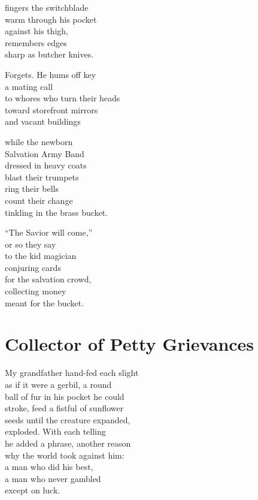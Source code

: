 \documentclass[twoside,10pt]{book}
\begin{document}
fingers the switchblade\\
warm through his pocket\\
against his thigh,\\
remembers edges\\
sharp as butcher knives.

Forgets. He hums off key\\
a mating call\\
to whores who turn their heads\\
toward storefront mirrors\\
and vacant buildings

while the newborn\\
Salvation Army Band\\
dressed in heavy coats\\
blast their trumpets\\
ring their bells\\
count their change\\
tinkling in the brass bucket.

``The Savior will come,''\\
or so they say\\
to the kid magician\\
conjuring cards\\
for the salvation crowd,\\
collecting money\\
meant for the bucket.


\clearpage
\section{Collector of Petty Grievances}

My grandfather hand-fed each slight\\
as if it were a gerbil, a round\\
ball of fur in his pocket he could\\
stroke, feed a fistful of sunflower\\
seeds until the creature expanded,\\
exploded. With each telling\\
he added a phrase, another reason\\
why the world took against him:\\
a man who did his best,\\
a man who never gambled\\
except on luck.
\end{document}
